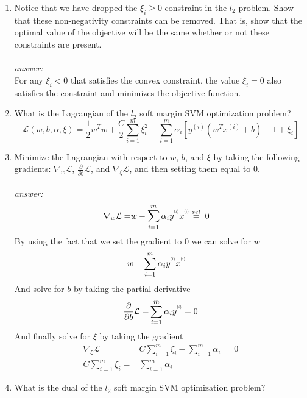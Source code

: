 \documentclass{article}
\newcommand{\supi}[1]{\scalebox{0.6}[0.75]{$^{(#1)}$}}\newcommand{\supi}{\scalebox{0.6}[0.75]{$^{(i)}$}}
\begin{document}
\begin{enumerate}[label=(\alph*)]
    \item Notice that we have dropped the $\xi_i \geq 0$ constraint in the $l_2$ problem. Show that these non-negativity constraints can be removed. That is, show that the optimal value of the objective will be the same whether or not these constraints are present.\\\\
    \textit{answer:}\\
    For any $\xi_i < 0$ that satisfies the convex constraint, the value $\xi_i = 0$ also satisfies the constraint and minimizes the objective function.
    \item What is the Lagrangian of the $l_2$ soft margin SVM optimization problem?
    \begin{equation*}
        \mathcal{L}(w,b,\alpha, \xi) = \frac{1}{2}w^Tw + \frac{C}{2}\sum_{i=1}^{m}\xi_i^2-\sum_{i=1}^{m}\alpha_i[y^{(i)}(w^Tx^{(i)}+b)-1+\xi_i]
    \end{equation*}
    \item Minimize the Lagrangian with respect to $w$, $b$, and $\xi$ by taking the following gradients: $\nabla_w\mathcal{L}$, $\frac{\partial}{\partial b}\mathcal{L}$, and $\nabla_\xi\mathcal{L}$, and then setting them equal to 0.\\\\
    \textit{answer:}
    \begin{align*}
        \nabla_w \mathcal{L} =&{} w - \sum_{i=1}^m\alpha_iy^{\supi{i}}x^{\supi{i}} \overset{set}=\: 0
    \end{align*}
    By using the fact that we set the gradient to $0$ we can solve for $w$
    \begin{align*}
        w =&{}\sum_{i=1}^m\alpha_iy^{\supi{i}}x^{\supi{i}}
    \end{align*}
    And solve for $b$ by taking the partial derivative
    \begin{align*}
        \frac{\partial}{\partial b}\mathcal{L} =&{} \sum_{i=1}^m\alpha_iy^{\supi{i}} = 0\\
    \end{align*}
    And finally solve for $\xi$ by taking the gradient
    \begin{align*}
        \nabla_\xi \mathcal{L} =&{} C\sum_{i=1}^m\xi_i - \sum_{i=1}^m\alpha_i =\: 0\\
        C\sum_{i=1}^m\xi_i =&{}\sum_{i=1}^m\alpha_i
    \end{align*}
    \item What is the dual of the $l_2$ soft margin SVM optimization problem?\\\\

\end{enumerate}
\end{document}
